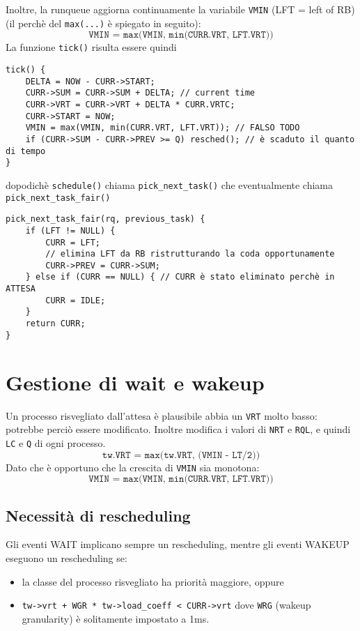 \documentclass[12pt, a4paper]{report}
\begin{document}
Inoltre, la runqueue aggiorna continuamente la variabile \texttt{VMIN} (LFT =
left of RB) (il perchè del \texttt{max(...)} è spiegato in seguito):
\[
	\texttt{VMIN = max(VMIN, min(CURR.VRT, LFT.VRT))}
\]
La funzione \texttt{tick()} risulta essere quindi
\begin{verbatim}
tick() {
    DELTA = NOW - CURR->START;
    CURR->SUM = CURR->SUM + DELTA; // current time
    CURR->VRT = CURR->VRT + DELTA * CURR.VRTC;
    CURR->START = NOW;
    VMIN = max(VMIN, min(CURR.VRT, LFT.VRT)); // FALSO TODO
    if (CURR->SUM - CURR->PREV >= Q) resched(); // è scaduto il quanto di tempo
}
\end{verbatim}
dopodichè \texttt{schedule()} chiama \texttt{pick\_next\_task()} che eventualmente
chiama \texttt{pick\_next\_task\_fair()}
\begin{verbatim}
pick_next_task_fair(rq, previous_task) {
    if (LFT != NULL) {
        CURR = LFT;
        // elimina LFT da RB ristrutturando la coda opportunamente
        CURR‐>PREV = CURR‐>SUM;
    } else if (CURR == NULL) { // CURR è stato eliminato perchè in ATTESA
        CURR = IDLE;
    }
    return CURR;
}
\end{verbatim}

\section{Gestione di wait e wakeup}
Un processo risvegliato dall'attesa è plausibile abbia un \texttt{VRT} molto
basso: potrebbe perciò essere modificato. Inoltre modifica i valori di
\texttt{NRT} e \texttt{RQL}, e quindi \texttt{LC} e \texttt{Q} di ogni processo.
\[
	\texttt{tw.VRT = max(tw.VRT, (VMIN - LT/2))}
\]
Dato che è opportuno che la crescita di \texttt{VMIN} sia monotona:
\[
	\texttt{VMIN = max(VMIN, min(CURR.VRT, LFT.VRT))}
\]

\subsection{Necessità di rescheduling}
Gli eventi WAIT implicano sempre un rescheduling, mentre gli eventi WAKEUP
eseguono un rescheduling se:
\begin{itemize}
	\item la classe del processo risvegliato ha priorità maggiore, oppure
	\item \texttt{tw‐>vrt + WGR * tw‐>load\_coeff < CURR‐>vrt} dove
		\texttt{WRG} (wakeup granularity) è solitamente impostato a 1ms.
\end{itemize}
\end{document}
